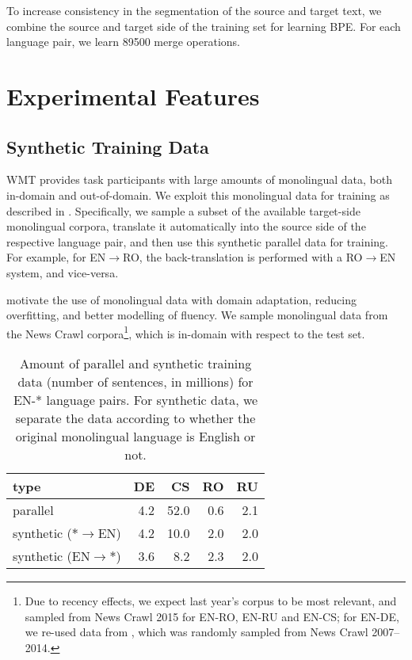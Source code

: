 \documentclass[11pt]{article}
\begin{document}
To increase consistency in the segmentation of the source and target text, we combine the source and target side of the training set for learning BPE.
For each language pair, we learn \num{89500} merge operations.

\section{Experimental Features}

\subsection{Synthetic Training Data}

WMT provides task participants with large amounts of monolingual data, both in-domain and out-of-domain.
We exploit this monolingual data for training as described in \cite{2015arXiv151106709S}.
Specifically, we sample a subset of the available target-side monolingual corpora, translate it automatically into the source side of the respective language pair,
and then use this synthetic parallel data for training.
For example, for EN$\to$RO, the back-translation is performed with a RO$\to$EN system, and vice-versa.

 motivate the use of monolingual data with domain adaptation, reducing overfitting, and better modelling of fluency.
We sample monolingual data from the News Crawl corpora\footnote{Due to recency effects, we expect last year's corpus to be most relevant, and sampled from News Crawl 2015 for EN-RO, EN-RU and EN-CS; for EN-DE, we re-used data from \cite{2015arXiv151106709S}, which was randomly sampled from News Crawl 2007--2014.}, which is in-domain with respect to the test set.

\begin{table}
\centering
\begin{tabular}{l|rrrr}
type & DE & CS & RO & RU\\
\hline
parallel & 4.2 & 52.0 & 0.6 & 2.1 \\
synthetic ($*\to$EN) & 4.2 & 10.0 & 2.0 & 2.0\\
synthetic (EN$\to*$) & 3.6 & 8.2 & 2.3 & 2.0\\
\end{tabular}
\caption{Amount of parallel and synthetic training data (number of sentences, in millions) for EN-* language pairs. 
For synthetic data, we separate the data according to whether the original monolingual language is English or not. 
}
\label{data}
\end{table}
\end{document}
